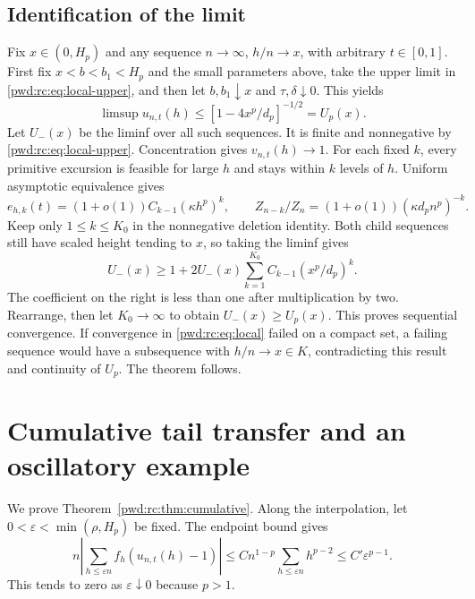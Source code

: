 \documentclass[11pt,letterpaper]{article}
\numberwithin{equation}{section}
\theoremstyle{remark}\newtheorem{remark}[theorem]{Remark}
\begin{document}
\subsection{Identification of the limit}
Fix $x\in(0,H_p)$ and any sequence $n\to\infty$, $h/n\to x$, with arbitrary $t\in[0,1]$. First fix $x<b<b_1<H_p$ and the small parameters above, take the upper limit in \eqref{pwd:rc:eq:local-upper}, and then let $b,b_1\downarrow x$ and $\tau,\delta\downarrow0$. This yields
\[
 \limsup u_{n,t}(h)\le[1-4x^p/d_p]^{-1/2}=U_p(x).
\]
Let $U_-(x)$ be the liminf over all such sequences. It is finite and nonnegative by \eqref{pwd:rc:eq:local-upper}. Concentration gives $v_{n,t}(h)\to1$. For each fixed $k$, every primitive excursion is feasible for large $h$ and stays within $k$ levels of $h$. Uniform asymptotic equivalence gives
\[
 e_{h,k}(t)=(1+o(1))C_{k-1}(\kappa h^p)^k,\qquad
 Z_{n-k}/Z_n=(1+o(1))(\kappa d_p n^p)^{-k}.
\]
Keep only $1\le k\le K_0$ in the nonnegative deletion identity. Both child sequences still have scaled height tending to $x$, so taking the liminf gives
\[
 U_-(x)\ge1+2U_-(x)\sum_{k=1}^{K_0}C_{k-1}(x^p/d_p)^k.
\]
The coefficient on the right is less than one after multiplication by two. Rearrange, then let $K_0\to\infty$ to obtain $U_-(x)\ge U_p(x)$. This proves sequential convergence. If convergence in \eqref{pwd:rc:eq:local} failed on a compact set, a failing sequence would have a subsequence with $h/n\to x\in K$, contradicting this result and continuity of $U_p$. The theorem follows.

\section{Cumulative tail transfer and an oscillatory example}\label{pwd:rc:sec:cumulative}
We prove Theorem~\ref{pwd:rc:thm:cumulative}. Along the interpolation, let $0<\varepsilon<\min(\rho,H_p)$ be fixed. The endpoint bound gives
\begin{equation}\label{pwd:rc:eq:cum-low}
 n\left|\sum_{h\le\varepsilon n}f_h(u_{n,t}(h)-1)\right|
 \le Cn^{1-p}\sum_{h\le\varepsilon n}h^{p-2}
 \le C'\varepsilon^{p-1}.
\end{equation}
This tends to zero as $\varepsilon\downarrow0$ because $p>1$.
\end{document}
